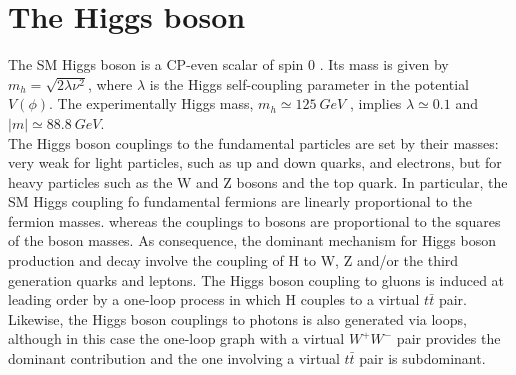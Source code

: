 \section{The Higgs boson}
The SM Higgs boson is a CP-even scalar of spin 0 \cite{PDG}. Its mass is given by $m_{h} = \sqrt{2\lambda\nu^{2}}$, where $\lambda$ is the Higgs self-coupling parameter in the potential $V(\phi)$. The experimentally Higgs mass, $m_{h} \simeq 125\ GeV$ \cite{ALTAS_H}\cite{CMS_H}, implies $\lambda \simeq 0.1$ and $|m| \simeq 88.8\ GeV$. \\
The Higgs boson couplings to the fundamental particles are set by their masses: very weak for light particles, such as up and down quarks, and electrons, but for heavy particles such as the W and Z bosons and the top quark. In particular, the SM Higgs coupling fo fundamental fermions are linearly proportional to the fermion masses. whereas the couplings to bosons are proportional to the squares of the boson masses. As consequence, the dominant mechanism for Higgs boson production and decay involve the coupling of H to W, Z and/or the third generation quarks and leptons. The Higgs boson coupling to  gluons is induced at leading order by a one-loop process in which H couples to a virtual $t\bar{t}$ pair. Likewise, the Higgs boson couplings to photons is also generated via loops, although in this case the one-loop graph with a virtual $W^{+}W^{-}$ pair provides the dominant contribution and the one involving a virtual $t\bar{t}$ pair is subdominant. \\













